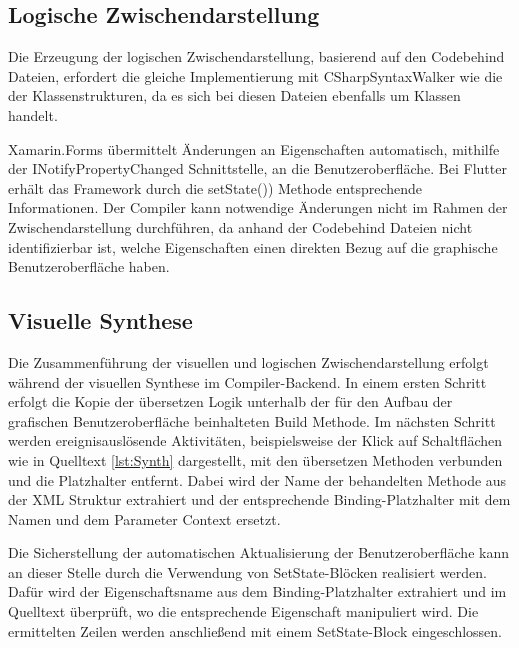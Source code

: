 \subsection{Logische Zwischendarstellung}

Die Erzeugung der logischen Zwischendarstellung,  basierend auf den Codebehind Dateien,  erfordert die gleiche Implementierung mit \glq CSharpSyntaxWalker\grq{} wie die der Klassenstrukturen,  da es sich bei diesen Dateien ebenfalls um \Csharp{} Klassen handelt.  

Xamarin.Forms übermittelt Änderungen an  Eigenschaften automatisch, mithilfe der \glq INotifyPropertyChanged\grq{}  Schnittstelle, an die Benutzeroberfläche.  Bei Flutter erhält das Framework durch die \glq setState())\grq{}  Methode entsprechende Informationen.  Der Compiler kann notwendige Änderungen nicht im Rahmen der Zwischendarstellung durchführen, da anhand der Codebehind Dateien nicht identifizierbar ist, welche Eigenschaften einen direkten Bezug auf die graphische Benutzeroberfläche haben. 

\subsection{Visuelle Synthese}

Die Zusammenführung der visuellen und logischen Zwischendarstellung erfolgt während der visuellen Synthese im Compiler-Backend.  In einem ersten Schritt erfolgt die Kopie der übersetzen Logik unterhalb der für den Aufbau der grafischen Benutzeroberfläche beinhalteten Build Methode.  Im nächsten Schritt werden ereignisauslösende Aktivitäten,  beispielsweise der Klick auf Schaltflächen wie in Quelltext \ref{lst:Synth} dargestellt,  mit den übersetzen Methoden verbunden und die Platzhalter entfernt.  Dabei wird der Name der behandelten Methode aus der XML Struktur extrahiert und der entsprechende Binding-Platzhalter mit dem Namen und dem Parameter \glq Context\grq{} ersetzt. 


 

Die Sicherstellung der automatischen Aktualisierung der Benutzeroberfläche kann an dieser Stelle durch die Verwendung von SetState-Blöcken  realisiert werden.  Dafür wird der Eigenschaftsname aus dem Binding-Platzhalter extrahiert und im Quelltext überprüft, wo die entsprechende Eigenschaft manipuliert wird.  Die ermittelten Zeilen werden anschließend mit einem SetState-Block eingeschlossen.


